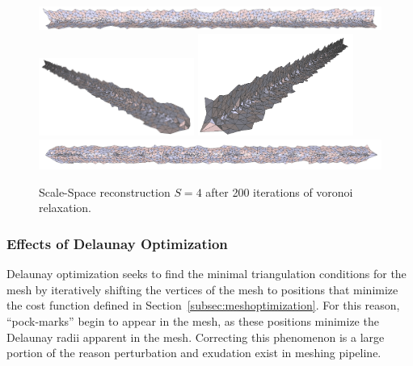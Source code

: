 \documentclass[12pt]{drexelthesis}
\let\Oldsubsubsection\subsubsection
\renewcommand{\subsubsection}{\FloatBarrier\Oldsubsubsection}
\begin{document}
\begin{figure}[!ht]
	\centering
		\includegraphics[width=5in]{simulated-lab-scan/0noise/optimizedNeat/scalespace4lloyd00.png}
		\includegraphics[width=2in]{simulated-lab-scan/0noise/optimizedNeat/scalespace4lloyd01.png}
		\includegraphics[width=2in]{simulated-lab-scan/0noise/optimizedNeat/scalespace4lloyd02.png}
		\includegraphics[width=5in]{simulated-lab-scan/0noise/optimizedNeat/scalespace4lloyd03.png}
		\caption[Scale-Space reconstruction $S = 4$ after 200 iterations of voronoi relaxation]{\centering Scale-Space reconstruction $S = 4$ after 200 iterations of voronoi relaxation.}
	\label{zeronoise:scalespace4lloyd}
\end{figure}


\subsubsection{Effects of Delaunay Optimization}

Delaunay optimization seeks to find the minimal triangulation conditions for the mesh by iteratively shifting the vertices of the mesh to positions that minimize the cost function defined in Section~\ref{subsec:meshoptimization}. For this reason, ``pock-marks'' begin to appear in the mesh, as these positions minimize the Delaunay radii apparent in the mesh. Correcting this phenomenon is a large portion of the reason perturbation and exudation exist in meshing pipeline.
\end{document}
